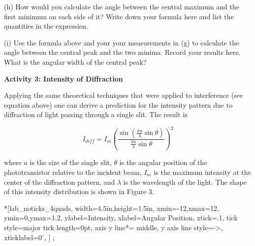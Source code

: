 \newpage

(h) How would you calculate the angle between the central maximum and the first 
minimum on each side of it? Write down your formula here and list the quantities in the expression.
\vspace{25mm}

(i) Use the formula above and your your measurements in (g) to calculate the
angle between the central peak and the two minima.
Record your results here.
What is the angular width of the central peak?
\vspace{25mm}



\textbf{Activity 3: Intensity of Diffraction} 

Applying the same theoretical techniques that were applied to interference
(see equation above) one can derive a prediction for the intensity
pattern due to diffraction of light passing through a single slit.
The result is 

\begin{equation} I_{diff} = I_m \left (\frac {\sin (\frac {\pi a} {\lambda} \sin \theta)} {\frac {\pi a} {\lambda} \sin \theta} \right )^2 \end{equation}

where $a$ is the size of the single slit, \( \theta  \) is the angular
position of the phototransistor relative to the incident beam, $I_{m}$
is the maximum intensity at the center of the diffraction pattern,
and \( \lambda  \) is the wavelength of the light. The shape of this
intensity distribution is shown in Figure 3.

\begin{lab_axis}*[lab_noticks_4quads,
	width=4.5in,height=1.5in,
	xmin=-12,xmax=12,
	ymin=0,ymax=1.2,
	ylabel=Intensity,
	xlabel=Angular Position,
	xtick={.1}, %
	tick style={major tick length=0pt},
	axis y line*= {middle, y axis line style={->}}, %
	xticklabel={0$^\circ$},
]
;
\end{lab_axis}

